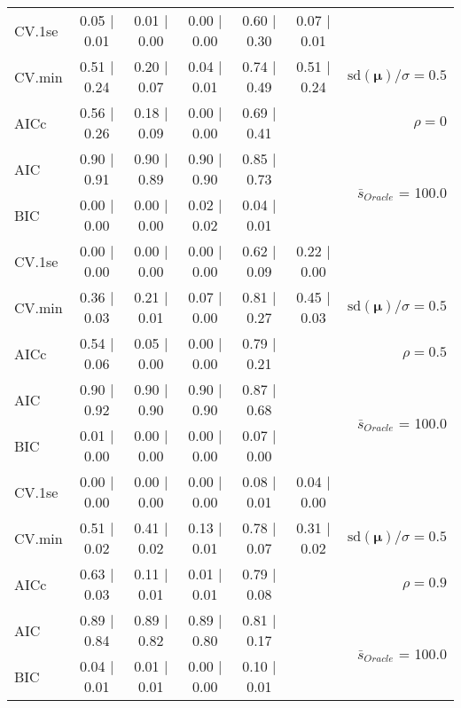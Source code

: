 \begin{table}
\begin{center}
\begin{tabular}{l*{5}{c}|r}
 \hline 
CV.1se & 0.05 $\mid$ 0.01 & 0.01 $\mid$ 0.00 & 0.00 $\mid$ 0.00 & 0.60 $\mid$ 0.30 & 0.07 $\mid$ 0.01 & \\
CV.min & 0.51 $\mid$ 0.24 & 0.20 $\mid$ 0.07 & 0.04 $\mid$ 0.01 & 0.74 $\mid$ 0.49 & 0.51 $\mid$ 0.24 &  $\mathrm{sd}(\mathbf{\mu})/\sigma=0.5$ \\
AICc & 0.56 $\mid$ 0.26 & 0.18 $\mid$ 0.09 & 0.00 $\mid$ 0.00 & 0.69 $\mid$ 0.41 & & $\rho=0$ \\
AIC & 0.90 $\mid$ 0.91 & 0.90 $\mid$ 0.89 & 0.90 $\mid$ 0.90 & 0.85 $\mid$ 0.73 & &  \multirow{2}{*}{$\bar{s}_{Oracle}$ = 100.0} \\
BIC & 0.00 $\mid$ 0.00 & 0.00 $\mid$ 0.00 & 0.02 $\mid$ 0.02 & 0.04 $\mid$ 0.01 & &  \\
 \hline 
CV.1se & 0.00 $\mid$ 0.00 & 0.00 $\mid$ 0.00 & 0.00 $\mid$ 0.00 & 0.62 $\mid$ 0.09 & 0.22 $\mid$ 0.00 & \\
CV.min & 0.36 $\mid$ 0.03 & 0.21 $\mid$ 0.01 & 0.07 $\mid$ 0.00 & 0.81 $\mid$ 0.27 & 0.45 $\mid$ 0.03 &  $\mathrm{sd}(\mathbf{\mu})/\sigma=0.5$ \\
AICc & 0.54 $\mid$ 0.06 & 0.05 $\mid$ 0.00 & 0.00 $\mid$ 0.00 & 0.79 $\mid$ 0.21 & & $\rho=0.5$ \\
AIC & 0.90 $\mid$ 0.92 & 0.90 $\mid$ 0.90 & 0.90 $\mid$ 0.90 & 0.87 $\mid$ 0.68 & &  \multirow{2}{*}{$\bar{s}_{Oracle}$ = 100.0} \\
BIC & 0.01 $\mid$ 0.00 & 0.00 $\mid$ 0.00 & 0.00 $\mid$ 0.00 & 0.07 $\mid$ 0.00 & &  \\
 \hline 
CV.1se & 0.00 $\mid$ 0.00 & 0.00 $\mid$ 0.00 & 0.00 $\mid$ 0.00 & 0.08 $\mid$ 0.01 & 0.04 $\mid$ 0.00 & \\
CV.min & 0.51 $\mid$ 0.02 & 0.41 $\mid$ 0.02 & 0.13 $\mid$ 0.01 & 0.78 $\mid$ 0.07 & 0.31 $\mid$ 0.02 &  $\mathrm{sd}(\mathbf{\mu})/\sigma=0.5$ \\
AICc & 0.63 $\mid$ 0.03 & 0.11 $\mid$ 0.01 & 0.01 $\mid$ 0.01 & 0.79 $\mid$ 0.08 & & $\rho=0.9$ \\
AIC & 0.89 $\mid$ 0.84 & 0.89 $\mid$ 0.82 & 0.89 $\mid$ 0.80 & 0.81 $\mid$ 0.17 & &  \multirow{2}{*}{$\bar{s}_{Oracle}$ = 100.0} \\
BIC & 0.04 $\mid$ 0.01 & 0.01 $\mid$ 0.01 & 0.00 $\mid$ 0.00 & 0.10 $\mid$ 0.01 & &  \\
 \hline 
\end{tabular}
\end{center}
\vspace{-1cm}
\end{table}




